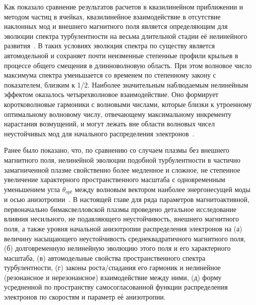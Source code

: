 Как показало сравнение результатов расчетов в квазилинейном приближении и методом частиц в ячейках, квазилинейное взаимодействие в отсутствие наклонных мод и внешнего магнитного поля является определяющим для эволюции спектра турбулентности на весьма длительной стадии её нелинейного развития~\cite{Ruyer2015,StockemNovo2015,Kuznetsov2022,Kuznetsov2023}. В таких условиях эволюция спектра по существу является автомодельной и сохраняет почти неизменные степенные профили крыльев в процессе общего смещения в длинноволновую область. При этом волновое число максимума спектра уменьшается со временем по степенному закону с показателем, близким к 1/2. Наиболее значительным наблюдаемым нелинейным эффектом оказалось четырехволновое взаимодействие. Оно формирует коротковолновые гармоники с волновыми числами, которые близки к утроенному оптимальному волновому числу, отвечающему максимальному инкременту нарастания возмущений, и могут лежать вне области волновых чисел неустойчивых мод для начального распределения электронов~\cite{Kuznetsov2023}. 

Ранее было показано, что, по сравнению со случаем плазмы без внешнего магнитного поля, нелинейной эволюции подобной турбулентности в частично замагниченной плазме свойственно более медленное и сложное, не степенное увеличение характерного пространственного масштаба с одновременным уменьшением угла $\theta_{opt}$ между волновым вектором наиболее энергонесущей моды и осью анизотропии~\cite{Camporeale2008,Hellinger2014}. В настоящей главе для ряда параметров магнитоактивной, первоначально бимаксвелловской плазмы проведено детальное исследование влияния несильного, не подавляющего неустойчивость, внешнего магнитного поля, а также уровня начальной анизотропии распределения электронов на
(а) величину насыщающего неустойчивость среднеквадратичного магнитного поля,
(б) долговременную нелинейную эволюцию этого поля и его характерного масштаба, 
(в) автомодельные свойства пространственного спектра турбулентности, 
(г) законы роста/спадания его гармоник и нелинейное (резонансное и нерезонансное) взаимодействие между ними, 
(д) форму усредненной по пространству самосогласованной функции распределения электронов по скоростям и параметр её анизотропии.

